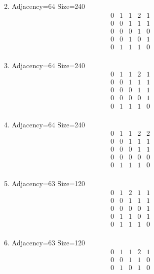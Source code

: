 \documentclass[12pt]{article}
\begin{document}
\begin{multicols}{3}
\begin{enumerate}
\begin{equation*}
\end{equation*}
\item Adjacency=64 Size=240
\begin{equation*}
\begin{array}{ccccc}
0&1&1&2&1\\
0&0&1&1&1\\
0&0&0&1&0\\
0&0&1&0&1\\
0&1&1&1&0\\
\end{array}
\end{equation*}
\item Adjacency=64 Size=240
\begin{equation*}
\begin{array}{ccccc}
0&1&1&2&1\\
0&0&1&1&1\\
0&0&0&1&1\\
0&0&0&0&1\\
0&1&1&1&0\\
\end{array}
\end{equation*}
\item Adjacency=64 Size=240
\begin{equation*}
\begin{array}{ccccc}
0&1&1&2&2\\
0&0&1&1&1\\
0&0&0&1&1\\
0&0&0&0&0\\
0&1&1&1&0\\
\end{array}
\end{equation*}
\item Adjacency=63 Size=120
\begin{equation*}
\begin{array}{ccccc}
0&1&2&1&1\\
0&0&1&1&1\\
0&0&0&0&1\\
0&1&1&0&1\\
0&1&1&1&0\\
\end{array}
\end{equation*}
\item Adjacency=63 Size=120
\begin{equation*}
\begin{array}{ccccc}
0&1&1&2&1\\
0&0&1&1&0\\
0&1&0&1&0\\

\end{array}
\end{equation*}
\end{enumerate}
\end{multicols}
\end{document}
